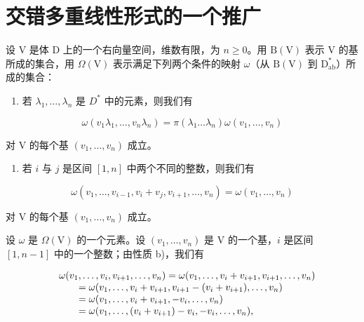 \section{交错多重线性形式的一个推广}

设 \(\mathrm{V}\) 是体 \(\mathrm{D}\) 上的一个右向量空间，维数有限，为 \(n \geqslant 0\)。用 \(\mathrm{B(V)}\) 表示 \(\mathrm{V}\) 的基所成的集合，用 \(\Omega(\mathrm{V})\) 表示满足下列两个条件的映射 \(\omega\)（从 \(\mathrm{B(V)}\) 到 \(\mathrm{D}_{\mathrm{ab}}^{*}\)）所成的集合：

\begin{enumerate}
\def\labelenumi{\alph{enumi})}
\tightlist
\item
  若 \(\lambda_1, \ldots, \lambda_n\) 是 \(D^*\) 中的元素，则我们有
\end{enumerate}

\[
\omega (v _ {1} \lambda_ {1}, \ldots , v _ {n} \lambda_ {n}) = \pi (\lambda_ {1} \dots \lambda_ {n}) \omega (v _ {1}, \ldots , v _ {n})\tag{1}
\]

对 V 的每个基 \((v_{1},\ldots ,v_{n})\) 成立。

\begin{enumerate}
\def\labelenumi{\alph{enumi})}
\setcounter{enumi}{1}
\tightlist
\item
  若 \(i\) 与 \(j\) 是区间 \([1, n]\) 中两个不同的整数，则我们有
\end{enumerate}

\[
\omega (v _ {1}, \ldots , v _ {i - 1}, v _ {i} + v _ {j}, v _ {i + 1}, \ldots , v _ {n}) = \omega (v _ {1}, \ldots , v _ {n})\tag{2}
\]

对 V 的每个基 \((v_{1},\ldots ,v_{n})\) 成立。

设 \(\omega\) 是 \(\Omega(\mathrm{V})\) 的一个元素。设 \((v_1, \ldots, v_n)\) 是 \(\mathrm{V}\) 的一个基，\(i\) 是区间 \([1, n-1]\) 中的一个整数；由性质 b)，我们有

\[
\begin{array}{r l} & {\omega (v _ {1}, \ldots , v _ {i}, v _ {i + 1}, \ldots , v _ {n}) = \omega (v _ {1}, \ldots , v _ {i} + v _ {i + 1}, v _ {i + 1}, \ldots , v _ {n})} \\ & {\qquad = \omega (v _ {1}, \ldots , v _ {i} + v _ {i + 1}, v _ {i + 1} - (v _ {i} + v _ {i + 1}), \ldots , v _ {n})} \\ & {\qquad = \omega (v _ {1}, \ldots , v _ {i} + v _ {i + 1}, - v _ {i}, \ldots , v _ {n})} \\ & {\qquad = \omega (v _ {1}, \ldots , (v _ {i} + v _ {i + 1}) - v _ {i}, - v _ {i}, \ldots , v _ {n}),} \end{array}
\]

